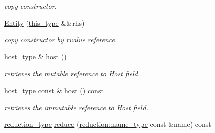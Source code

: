 \begin{DoxyCompactItemize}
\begin{DoxyCompactList}\small\item\em copy constructor. \end{DoxyCompactList}\item 
\hypertarget{classhryky_1_1http_1_1header_1_1_entity_a45b1d4d21c174af1704539fc5fb88401}{\hyperlink{classhryky_1_1http_1_1header_1_1_entity_a45b1d4d21c174af1704539fc5fb88401}{Entity} (\hyperlink{classhryky_1_1http_1_1header_1_1_entity_a2d6b33008fa9a1607970c743ee7ee545}{this\-\_\-type} \&\&rhs)}\label{classhryky_1_1http_1_1header_1_1_entity_a45b1d4d21c174af1704539fc5fb88401}

\begin{DoxyCompactList}\small\item\em copy constructor by rvalue reference. \end{DoxyCompactList}\item 
\hypertarget{classhryky_1_1http_1_1header_1_1_entity_ae20de3c4178c7a38202e68def39e8448}{\hyperlink{classhryky_1_1uri_1_1authority_1_1_entity}{host\-\_\-type} \& \hyperlink{classhryky_1_1http_1_1header_1_1_entity_ae20de3c4178c7a38202e68def39e8448}{host} ()}\label{classhryky_1_1http_1_1header_1_1_entity_ae20de3c4178c7a38202e68def39e8448}

\begin{DoxyCompactList}\small\item\em retrieves the mutable reference to Host field. \end{DoxyCompactList}\item 
\hypertarget{classhryky_1_1http_1_1header_1_1_entity_ac25d4ea832b64d279e1ff459b99add07}{\hyperlink{classhryky_1_1uri_1_1authority_1_1_entity}{host\-\_\-type} const \& \hyperlink{classhryky_1_1http_1_1header_1_1_entity_ac25d4ea832b64d279e1ff459b99add07}{host} () const }\label{classhryky_1_1http_1_1header_1_1_entity_ac25d4ea832b64d279e1ff459b99add07}

\begin{DoxyCompactList}\small\item\em retrieves the immutable reference to Host field. \end{DoxyCompactList}\item 
\hypertarget{classhryky_1_1http_1_1header_1_1_entity_ae813fd530baefc3d26d312982a478154}{\hyperlink{namespacehryky_a343a9a4c36a586be5c2693156200eadc}{reduction\-\_\-type} \hyperlink{classhryky_1_1http_1_1header_1_1_entity_ae813fd530baefc3d26d312982a478154}{reduce} (\hyperlink{namespacehryky_1_1reduction_ac686c30a4c8d196bbd0f05629a6b921f}{reduction\-::name\-\_\-type} const \&name) const }\label{classhryky_1_1http_1_1header_1_1_entity_ae813fd530baefc3d26d312982a478154}


\end{DoxyCompactItemize}
